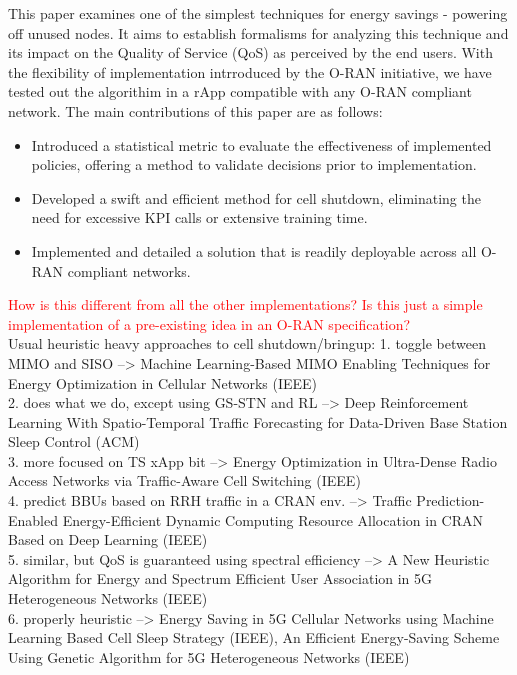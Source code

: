 This paper examines one of the simplest techniques for energy savings - powering off unused nodes. 
It aims to establish formalisms for analyzing this technique and its impact on the Quality of Service (QoS) as perceived by the end users.
With the flexibility of implementation intrroduced by the O-RAN initiative, we have tested out the algorithim in a rApp compatible with any O-RAN compliant network. 
The main contributions of this paper are as follows:
\begin{itemize}
    \item Introduced a statistical metric to evaluate the effectiveness of implemented policies, offering a method to validate decisions prior to implementation.
    \item Developed a swift and efficient method for cell shutdown, eliminating the need for excessive KPI calls or extensive training time.
    \item Implemented and detailed a solution that is readily deployable across all O-RAN compliant networks.
\end{itemize}

\textcolor{red}{How is this different from all the other implementations? Is this just a simple implementation of a pre-existing idea in an O-RAN specification?}\\
Usual heuristic heavy approaches to cell shutdown/bringup:
1. toggle between MIMO and SISO --> Machine Learning-Based MIMO Enabling Techniques for Energy Optimization in Cellular Networks (IEEE) \\
2. does what we do, except using GS-STN and RL --> Deep Reinforcement Learning With Spatio-Temporal Traffic Forecasting for Data-Driven Base Station Sleep Control (ACM) \\
3. more focused on TS xApp bit --> Energy Optimization in Ultra-Dense Radio Access Networks via Traffic-Aware Cell Switching (IEEE) \\
4. predict BBUs based on RRH traffic in a CRAN env. --> Traffic Prediction-Enabled Energy-Efficient Dynamic Computing Resource Allocation in CRAN Based on Deep Learning (IEEE) \\
5. similar, but QoS is guaranteed using spectral efficiency --> A New Heuristic Algorithm for Energy and Spectrum Efficient User Association in 5G Heterogeneous Networks (IEEE) \\ 
6. properly heuristic --> Energy Saving in 5G Cellular Networks using Machine Learning Based Cell Sleep Strategy (IEEE), An Efficient Energy-Saving Scheme Using Genetic Algorithm for 5G Heterogeneous Networks (IEEE) \\  

